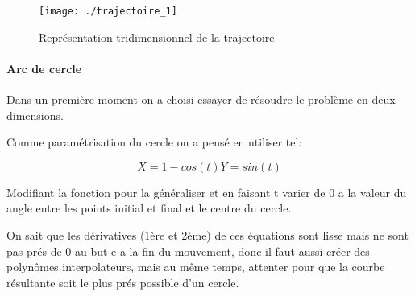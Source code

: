\begin{figure}[H]
	\begin{center}	
		\texttt{[image: ./trajectoire\_1]}
		\caption{Représentation tridimensionnel de la trajectoire}
		\label{fig:trajectoire}
	\end{center}
\end{figure}

\paragraph{Arc de cercle}

Dans un première moment on a choisi essayer de résoudre le problème  en deux dimensions.

Comme paramétrisation du cercle on a pensé en utiliser tel:

\begin{subequations}
	\begin{equation}
	X=1-cos(t)
	\end{equation}
	\begin{equation}
	Y=sin(t)
	\end{equation}
\end{subequations} 

Modifiant la fonction pour la généraliser et en faisant t varier de 0 a la valeur du angle entre les points initial et final et le centre du cercle.

On sait que les dérivatives (1ère et 2ème) de ces équations sont lisse mais ne sont pas prés de 0 au but e a la fin du mouvement, donc il faut aussi créer des polynômes interpolateurs, mais au même temps, attenter pour que la courbe résultante soit le plus prés possible d'un cercle.     